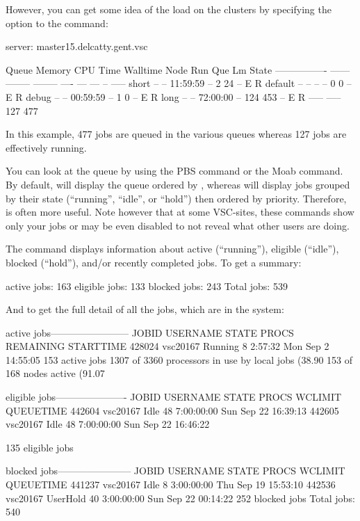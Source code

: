   However, you can get some idea of the load on the clusters by specifying
  the  option to the  command:

  \begin{prompt}
  server: master15.delcatty.gent.vsc
  
  Queue            Memory CPU Time Walltime Node  Run Que Lm  State
  ---------------- ------ -------- -------- ----  --- --- --  -----
  short              --      --    11:59:59   --    2  24 --   E R
  default            --      --       --      --    0   0 --   E R
  debug              --      --    00:59:59   --    1   0 --   E R
  long               --      --    72:00:00   --  124 453 --   E R
                                                 ----- -----
                                                   127   477
  \end{prompt}

  In this example, 477 jobs are queued in the various queues whereas 127 jobs
  are effectively running.

\else
  You can look at
  the queue by using the PBS  command or the Moab
   command. By default,  will display the queue
  ordered by , whereas  will display jobs grouped by
  their state (``running'', ``idle'', or ``hold'') then ordered by priority.
  Therefore,  is often more useful.
  Note however that at some VSC-sites, these commands show only your jobs or may
  be even disabled to not reveal what other users are doing.
  
  The  command displays information about active (``running''),
  eligible (``idle''), blocked (``hold''), and/or recently completed jobs. To get
  a summary:
  
  \begin{prompt}
  active jobs: 163
  eligible jobs: 133
  blocked jobs: 243
  Total jobs:  539
  \end{prompt}

\fi

\ifantwerpen
And to get the full detail of all the jobs, which are in the system:

\begin{prompt}
active jobs------------------------
JOBID     USERNAME  STATE PROCS REMAINING          STARTTIME
428024    vsc20167  Running   8   2:57:32  Mon Sep  2 14:55:05
153 active jobs 1307 of 3360 processors in use by local jobs (38.90%
153 of 168 nodes active      (91.07%

eligible jobs----------------------
JOBID     USERNAME  STATE PROCS   WCLIMIT            QUEUETIME
442604    vsc20167   Idle  48  7:00:00:00  Sun Sep 22 16:39:13
442605    vsc20167   Idle  48  7:00:00:00  Sun Sep 22 16:46:22

135 eligible jobs

blocked jobs-----------------------
JOBID   USERNAME     STATE PROCS WCLIMIT            QUEUETIME
441237  vsc20167      Idle   8 3:00:00:00 Thu Sep 19 15:53:10
442536  vsc20167  UserHold  40 3:00:00:00 Sun Sep 22 00:14:22
252 blocked jobs
Total jobs:  540
\end{prompt}
\fi

